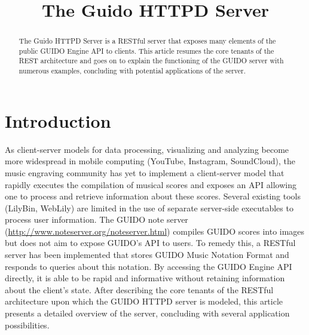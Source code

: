 \documentclass{article}
\title{The Guido HTTPD Server}
\date{}
\begin{document}
\maketitle

\begin{abstract}
The Guido HTTPD Server is a RESTful server that exposes many elements of the public GUIDO Engine API to clients.  This article resumes the core tenants of the REST architecture and goes on to explain the functioning of the GUIDO server with numerous examples, concluding with potential applications of the server.
\end{abstract}


\section{Introduction}
As client-server models for data processing, visualizing and analyzing become more widespread in mobile computing (YouTube, Instagram, SoundCloud), the music engraving community has yet to implement a client-server model that rapidly executes the compilation of musical scores and exposes an API allowing one to process and retrieve information about these scores.  Several existing tools (LilyBin, WebLily) are limited in the use of separate server-side executables to process user information.  The GUIDO note server (\url{http://www.noteserver.org/noteserver.html}) compiles GUIDO scores into images but does not aim to expose GUIDO's API to users.  To remedy this, a RESTful server has been implemented that stores GUIDO Music Notation Format and responds to queries about this notation.  By accessing the GUIDO Engine API directly, it is able to be rapid and informative without retaining information about the client's state.  After describing the core tenants of the RESTful architecture upon which the GUIDO HTTPD server is modeled, this article presents a detailed overview of the server, concluding with several application possibilities.

\end{document}
